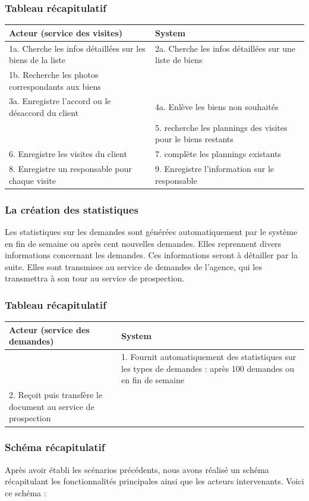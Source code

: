 \subsubsection*{Tableau récapitulatif}
\begin{longtable}{|p{7.5cm}|p{7.5cm}|}
\hline
Acteur (service des visites)& System\\
\hline
1a. Cherche les infos détaillées sur les biens de la liste & 2a. Cherche les infos détaillées sur une liste de biens\\
1b. Recherche les photos correspondants aux biens & \\
3a. Enregistre l'accord ou le désaccord du client & 4a. Enlève les biens non souhaités\\
& 5. recherche les plannings des visites pour le biens restants\\
6. Enregistre les visites du client & 7. complète les plannings existants\\
8. Enregistre un responsable pour chaque visite & 9. Enregistre l'information sur le responsable\\
\hline
\end{longtable}
\subsubsection{La création des statistiques}
Les statistiques sur les demandes sont générées automatiquement par le système en fin de semaine ou après cent nouvelles demandes.
Elles reprennent divers informations concernant les demandes. Ces informations seront à détailler par la suite.
Elles sont transmises au service de demandes de l'agence, qui les transmettra à son tour au service de prospection.

\subsubsection*{Tableau récapitulatif}
\begin{longtable}{|p{7.5cm}|p{7.5cm}|}
\hline
Acteur (service des demandes)& System\\
\hline
& 1. Fournit automatiquement des statistiques sur les types de demandes : après 100 demandes ou en fin de semaine\\
2. Reçoit puis transfère le document au service de prospection & \\
\hline
\end{longtable}

\newpage
\subsubsection{Schéma récapitulatif}
Après avoir établi les scénarios précédents, nous avons réalisé un schéma récapitulant les fonctionnalités principales ainsi que les acteurs intervenants. Voici ce schéma :

